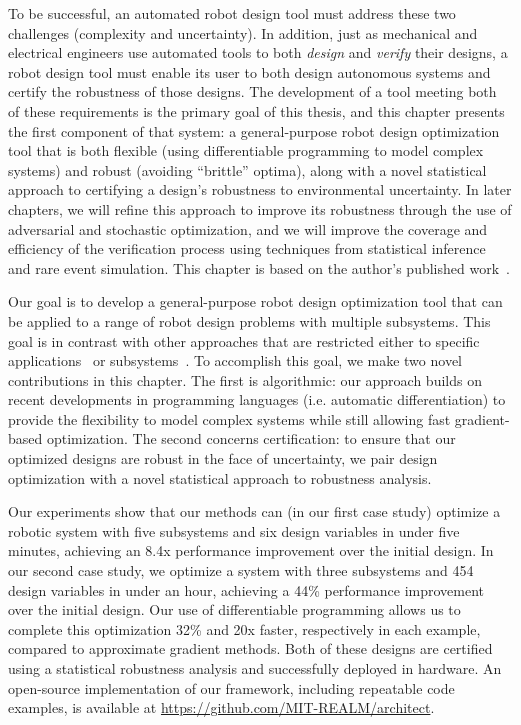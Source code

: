To be successful, an automated robot design tool must address these two challenges (complexity and uncertainty). In addition, just as mechanical and electrical engineers use automated tools to both \textit{design} and \textit{verify} their designs, a robot design tool must enable its user to both design autonomous systems and certify the robustness of those designs. The development of a tool meeting both of these requirements is the primary goal of this thesis, and this chapter presents the first component of that system: a general-purpose robot design optimization tool that is both flexible (using differentiable programming to model complex systems) and robust (avoiding ``brittle'' optima), along with a novel statistical approach to certifying a design's robustness to environmental uncertainty. In later chapters, we will refine this approach to improve its robustness through the use of adversarial and stochastic optimization, and we will improve the coverage and efficiency of the verification process using techniques from statistical inference and rare event simulation. This chapter is based on the author's published work~\cite{dawsonCertifiableRobotDesign2022}.

Our goal is to develop a general-purpose robot design optimization tool that can be applied to a range of robot design problems with multiple subsystems. This goal is in contrast with other approaches that are restricted either to specific applications~\cite{Schulz_robogami,du2016computational,soft_robot_optimization_review,du2021underwater,ma2021diffaqua,zhang_mdo_analysis} or subsystems~\cite{xu_uav_controllers}. To accomplish this goal, we make two novel contributions in this chapter. The first is algorithmic: our approach builds on recent developments in programming languages (i.e. automatic differentiation) to provide the flexibility to model complex systems while still allowing fast gradient-based optimization. The second concerns certification: to ensure that our optimized designs are robust in the face of uncertainty, we pair design optimization with a novel statistical approach to robustness analysis.

Our experiments show that our methods can (in our first case study) optimize a robotic system with five subsystems and six design variables in under five minutes, achieving an 8.4x performance improvement over the initial design. In our second case study, we optimize a system with three subsystems and 454 design variables in under an hour, achieving a 44\% performance improvement over the initial design. Our use of differentiable programming allows us to complete this optimization 32\% and 20x faster, respectively in each example, compared to approximate gradient methods. Both of these designs are certified using a statistical robustness analysis and successfully deployed in hardware. An open-source implementation of our framework, including repeatable code examples, is available at \url{https://github.com/MIT-REALM/architect}.

